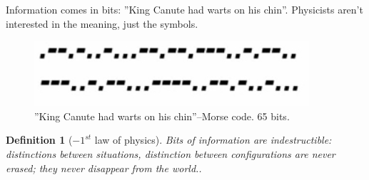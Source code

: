 \documentclass[]{article}
\newtheorem{defn}[thm]{Definition}
\begin{document}
{\begin{appendices}
	Information comes in bits: ''King Canute had warts on his chin''. Physicists aren't interested in the meaning, just the symbols.
	
	\begin{figure}[H]
		\caption{''King Canute had warts on his chin''--Morse code. 65 bits.}
		\includegraphics{wh-kcwc}
	\end{figure}
	
	\begin{defn}[$-1^{st}$ law of physics]
		Bits of information are indestructible: distinctions between situations, distinction between configurations are never erased; they never disappear from the world..
	\end{defn}


\end{appendices}}
\end{document}
